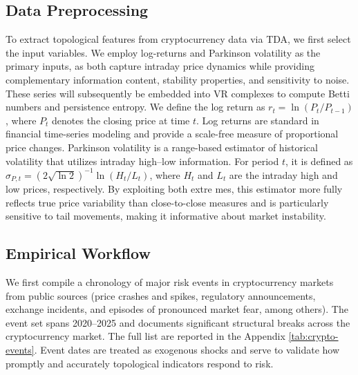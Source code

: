 \documentclass[11pt,reqno]{amsart}
\numberwithin{equation}{section} %
\begin{document}
\subsection{Data Preprocessing}
To extract topological features from cryptocurrency data via TDA, we first select the input variables. We employ log-returns and Parkinson volatility as the primary inputs, as both capture intraday price dynamics while providing complementary information content, stability properties, and sensitivity to noise. These series will subsequently be embedded into VR complexes to compute Betti numbers and persistence entropy.
We define the log return as
$r_t = \ln(P_t / P_{t-1})$,
\label{eq:log-return}
where \(P_t\) denotes the closing price at time \(t\). Log returns are standard in financial time-series modeling and provide a scale-free measure of proportional price changes\citep{RN4353}.
Parkinson volatility \cite{parkinson1980extreme} is a range-based estimator of historical volatility that utilizes intraday high--low information. 
For period \(t\), it is defined as
$\sigma_{P,t} = (2\sqrt{\ln 2})^{-1}\ln(H_t / L_t)$\label{eq:parkinson},
where \(H_t\) and \(L_t\) are the intraday high and low prices, respectively. 
By exploiting both extre mes, this estimator more fully reflects true price variability than close-to-close measures and is particularly sensitive to tail movements, making it informative about market instability.

\subsection{Empirical Workflow}
We first compile a chronology of major risk events in cryptocurrency markets from public sources (price crashes and spikes, regulatory announcements, exchange incidents, and episodes of pronounced market fear, among others). The event set spans 2020--2025 and documents significant structural breaks across the cryptocurrency market. The full list are reported in the Appendix \ref{tab:crypto-events}. Event dates are treated as exogenous shocks and serve to validate how promptly and accurately topological indicators respond to risk.
\end{document}

